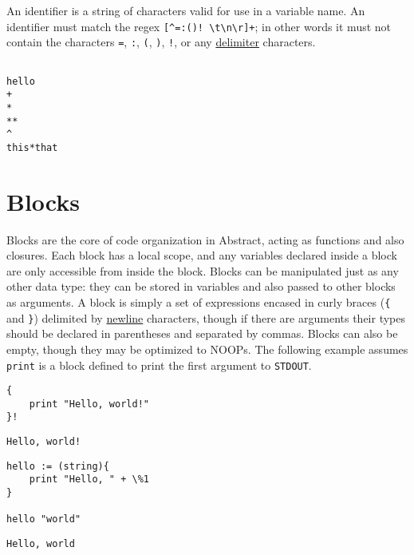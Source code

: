 \documentclass[letterpaper,titlepage]{scrreprt}
\begin{document}
An identifier is a string of characters valid for use in a variable name. An identifier must match the regex \lstinline{[^=:()! \t\n\r]+}; in other words it must not contain the characters \lstinline{=}, \lstinline{:}, \lstinline{(}, \lstinline{)}, \lstinline{!}, or any \hyperref[def:delimiter]{delimiter} characters.

\begin{lstlisting}[caption={Example identifiers},label=lst:identifiers]

hello
+
*
**
^
this*that

\end{lstlisting}

\section{Blocks}
\label{sec:Blocks}

Blocks are the core of code organization in Abstract, acting as functions and also closures. Each block has a local scope, and any variables declared inside a block are only accessible from inside the block. Blocks can be manipulated just as any other data type: they can be stored in variables and also passed to other blocks as arguments. A block is simply a set of expressions encased in curly braces (\lstinline|{| and \lstinline|}|) delimited by \hyperref[def:newline]{newline} characters, though if there are arguments their types should be declared in parentheses and separated by commas. Blocks can also be empty, though they may be optimized to NOOPs. The following example assumes \lstinline{print} is a block defined to print the first argument to \lstinline{STDOUT}.

\begin{lstlisting}[caption={Example block},label=lst:exampleblock]
{
	print "Hello, world!"
}!
\end{lstlisting}
\begin{lstlisting}[caption={Example block output},label=lst:exampleblockoutput]
Hello, world!
\end{lstlisting}

\begin{lstlisting}[caption={Example block with arguments},label=lst:exampleblockarg]
hello := (string){
	print "Hello, " + \%1
}

hello "world"
\end{lstlisting}
\begin{lstlisting}[caption={Example block with arguments output},label=lst:exampleblockargoutput]
Hello, world
\end{lstlisting}
\end{document}
